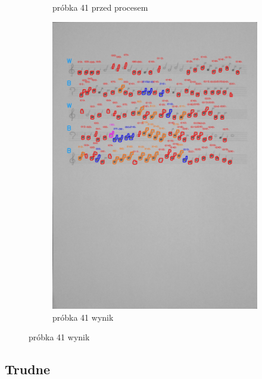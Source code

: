 \documentclass[11pt]{article}
\begin{document}
\begin{figure}
\begin{subfigure}[b]{0.475\textwidth}
        {{\small próbka 41 przed procesem}}
        \label{fig:sub3}
    \end{subfigure}
    \quad
    \begin{subfigure}[b]{0.475\textwidth}
        \centering
        \graphicspath{ {blobs/} }
        \includegraphics[width=\textwidth]{41_cnts.jpg}
        \caption[]%
        {{\small próbka 41 wynik}}
        \label{fig:sub 4}
    \end{subfigure}
    \label{fig 4}
\end{figure}

\FloatBarrier

\subsection{Trudne}
\end{document}
